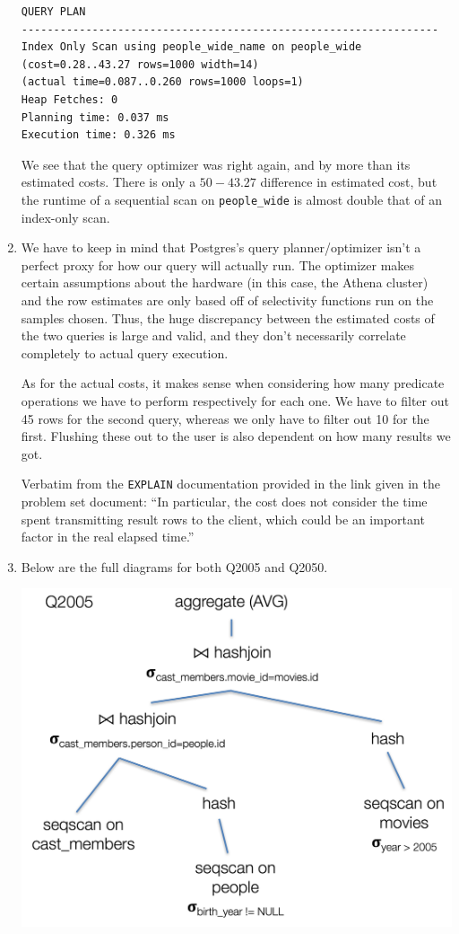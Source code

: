 \documentclass{article}
\begin{document}
\begin{enumerate}
\begin{verbatim}
QUERY PLAN                                                                 
-----------------------------------------------------------------
Index Only Scan using people_wide_name on people_wide  (cost=0.28..43.27 rows=1000 width=14) 
(actual time=0.087..0.260 rows=1000 loops=1)
Heap Fetches: 0
Planning time: 0.037 ms
Execution time: 0.326 ms
\end{verbatim}
We see that the query optimizer was right again, and by more than its estimated costs. There is only a $50-43.27$ difference in estimated cost, but the runtime of a sequential scan on \verb|people_wide| is almost double that of an index-only scan.

\item We have to keep in mind that Postgres's query planner/optimizer isn't a perfect proxy for how our query will actually run. The optimizer makes certain assumptions about the hardware (in this case, the Athena cluster) and the row estimates are only based off of selectivity functions run on the samples chosen. Thus, the huge discrepancy between the estimated costs of the two queries is large and valid, and they don't necessarily correlate completely to actual query execution. 

As for the actual costs, it makes sense when considering how many predicate operations we have to perform respectively for each one. We have to filter out 45 rows for the second query, whereas we only have to filter out 10 for the first. Flushing these out to the user is also dependent on how many results we got.

Verbatim from the \verb|EXPLAIN| documentation provided in the link given in the problem set document: ``In particular, the cost does not consider the time spent transmitting result rows to the client, which could be an important factor in the real elapsed time.''

\item Below are the full diagrams for both Q2005 and Q2050.

\begin{center}

\includegraphics[scale=0.3]{q2005.png}


\end{center}
\end{enumerate}
\end{document}
